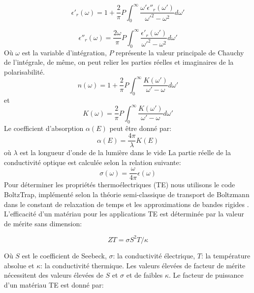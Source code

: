 \begin{equation}\label{3}
	\epsilon'_{r}(\omega)=1+\frac{2}{\pi}P\int_0^\infty\frac{\omega'\epsilon''_{r}(\omega')}{\omega'^{2}-\omega^{2}}d\omega' 
\end{equation}

\begin{equation}\label{4}
	\epsilon''_{r}(\omega)=\frac{2\omega}{\pi}P\int_0^\infty\frac{\epsilon'_{r}(\omega')}{\omega'^{2}-\omega^{2}}d\omega'
\end{equation}
Où $ \omega $ est la variable d'intégration, $ P $ représente la valeur principale de Chauchy de l'intégrale, de même, on peut relier les parties réelles et imaginaires de la polarisabilité.
\begin{equation}\label{5}
	n(\omega)=1+\frac{2}{\pi}P\int_0^\infty\frac{K(\omega')}{\omega'-\omega}d\omega'
\end{equation}
et 
\begin{equation}\label{6}
	K(\omega)=\frac{2}{\pi}P\int_0^\infty\frac{K(\omega')}{\omega'-\omega}d\omega'
\end{equation}
Le coefficient d'absorption $ \alpha (E) $ peut être donné par:
\begin{equation}\label{7}
	\alpha(E) = \frac{4\pi}{\lambda}K(E)
\end{equation}
où $ \lambda $ est la longueur d'onde de la lumière dans le vide La partie réelle de la conductivité optique est calculée selon la relation suivante:
\begin{equation}\label{8}
	\sigma(\omega) = \frac{\omega}{4\pi}\epsilon(\omega)
\end{equation}
Pour déterminer les propriétés thermoélectriques (TE) nous utilisons le code BoltzTrap, implémenté selon la théorie semi-classique de transport de Boltzmann dans  le constant  de relaxation de temps et les approximations de bandes rigides \cite{c11}. L'efficacité d'un matériau pour les applications TE est déterminée par la valeur de mérite sans dimension: 

\begin{equation}\label{9}
	ZT = \sigma S ^ {2} T / \kappa
\end{equation}

Où $ S $ est le coefficient de Seebeck, $ \sigma $: la conductivité électrique, $ T $: la température absolue et $ \kappa $: la conductivité thermique. Les valeurs élevées de facteur de mérite nécessitent des valeurs élevées de $ S $ et $ \sigma $ et de faibles $ \kappa $. Le facteur de puissance d'un matériau TE est donné par: 

